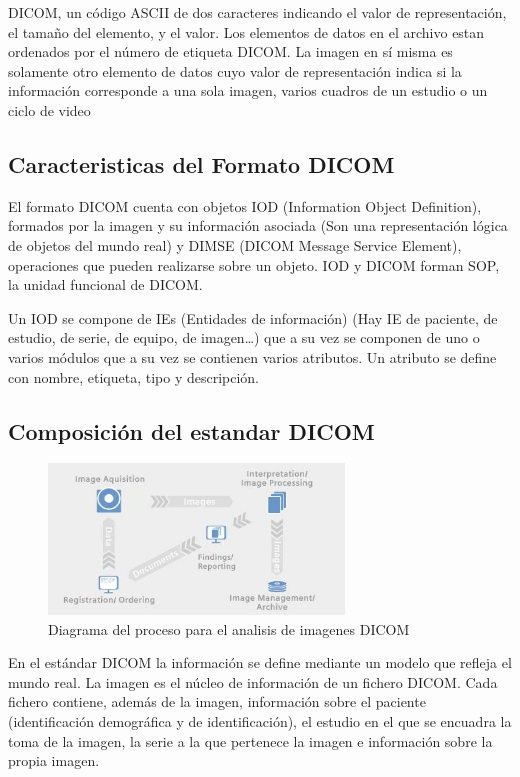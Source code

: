 \documentclass{article}
\begin{document}
	DICOM, un código ASCII de dos caracteres indicando el valor de representación, el tamaño del elemento, y el valor. Los elementos de datos en el archivo
estan ordenados por el número de etiqueta DICOM. La imagen en sí misma es solamente otro elemento de datos cuyo valor de representación indica si la información corresponde a una sola imagen, varios cuadros de un estudio o un ciclo de video

\subsection{Caracteristicas del Formato DICOM}
El formato DICOM cuenta con objetos IOD (Information Object Definition), formados por la imagen y su información asociada (Son una representación lógica de objetos del mundo real) y DIMSE (DICOM Message Service Element), operaciones que pueden realizarse sobre un objeto. IOD y DICOM forman SOP, la unidad funcional de DICOM.

Un IOD se compone de IEs (Entidades de información) (Hay IE de paciente, de estudio, de serie,  de equipo, de imagen…) que a su vez se componen de uno o varios módulos que a su vez se contienen varios atributos. Un atributo se define con nombre, etiqueta, tipo y descripción.

\subsection{Composición del estandar DICOM}

\begin{figure}[H]
\centering
\includegraphics[width=0.7\textwidth]{img/dicom_diagram.jpg}
\caption{Diagrama del proceso para el analisis de imagenes DICOM}
\end{figure}

En el estándar DICOM la información se define mediante un modelo que refleja el mundo real. La imagen es el núcleo de información de un fichero DICOM. Cada fichero contiene, además de la imagen, información sobre el paciente (identificación demográfica y de identificación), el estudio en el que se encuadra la toma de la imagen, la serie a la que pertenece la imagen e información sobre la propia imagen.
\end{document}
